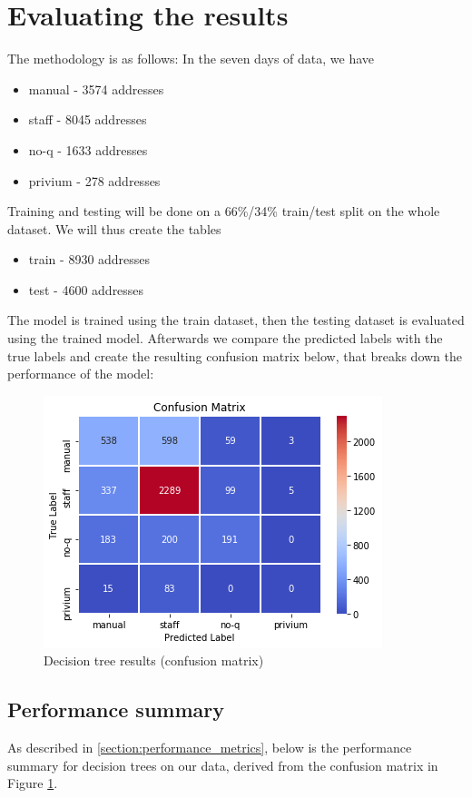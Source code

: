 \section{Evaluating the results}

The methodology is as follows: In the seven days of data, we have
\begin{itemize}
	\item manual - 3574 addresses 
	\item staff - 8045 addresses
	\item no-q - 1633 addresses
	\item privium - 278 addresses
\end{itemize}

Training and testing will be done on a 66\%/34\% train/test split on the whole dataset. We will thus create the tables

\begin{itemize}
	\item train - 8930 addresses 
	\item test  - 4600 addresses
\end{itemize}

The model is trained using the train dataset, then the testing dataset is evaluated using the trained model. Afterwards we compare the predicted labels with the true labels and create the resulting confusion matrix below, that breaks down the performance of the model:


\begin{figure}[H]
    \centering
    \includegraphics[width=.5\textwidth]{Pictures/decision_tree_confusion.png}
    \caption{Decision tree results (confusion matrix)}
    \label{fig:dectrees:confusion_matrix}
\end{figure}

\subsection{Performance summary}

As described in \ref{section:performance_metrics}, below is the performance summary for decision trees on our data, derived from the confusion matrix in Figure \ref{fig:dectrees:confusion_matrix}. 

